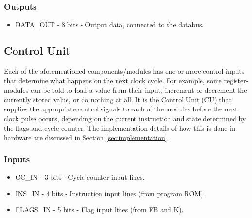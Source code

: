 \subsubsection*{Outputs}
\begin{itemize}
\itemsep0em 
\item DATA\_OUT - 8 bits - Output data, connected to the databus.
\end{itemize}



\subsection{Control Unit} \label{sec:architecture:cu}
Each of the aforementioned components/modules has one or more control inputs that determine what happens on the next clock cycle. For example, some register-modules can be told to load a value from their input, increment or decrement the currently stored value, or do nothing at all. It is the Control Unit (CU) that supplies the appropriate control signals to each of the modules before the next clock pulse occurs, depending on the current instruction and state determined by the flags and cycle counter. The implementation details of how this is done in hardware are discussed in Section \ref{sec:implementation}.

\subsubsection*{Inputs}
\begin{itemize}
\itemsep0em
\item CC\_IN - 3 bits - Cycle counter input lines.
\item INS\_IN - 4 bits - Instruction input lines (from program ROM).
\item FLAGS\_IN - 5 bits - Flag input lines (from FB and K).
\end{itemize}

